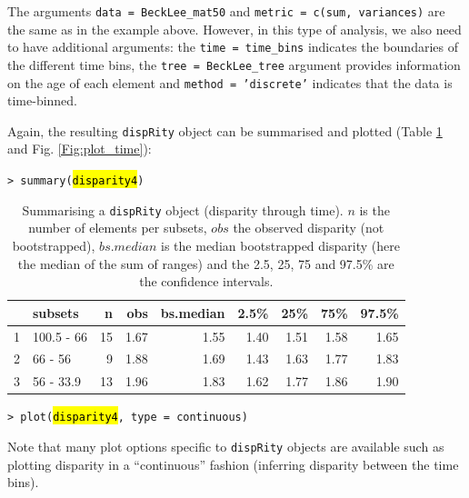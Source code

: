 \documentclass[12pt,letterpaper]{article}
\newcommand{\disp}{\texttt{dispRity} }
\begin{document}
\noindent The arguments \texttt{data = BeckLee\_mat50} and \texttt{metric = c(sum, variances)} are the same as in the example above.
However, in this type of analysis, we also need to have additional arguments: the \texttt{time = time\_bins} indicates the boundaries of the different time bins, the \texttt{tree = BeckLee\_tree} argument provides information on the age of each element and \texttt{method = 'discrete'} indicates that the data is time-binned.

Again, the resulting \disp object can be summarised and plotted (Table \ref{Tab:summary_time} and Fig. \ref{Fig:plot_time}):

\noindent \texttt{> summary(\hl{disparity4})}

\begin{table}[ht]
\centering
\begin{tabular}{rlrrrrrrr}
  \hline
 & subsets & n & obs & bs.median & 2.5\% & 25\% & 75\% & 97.5\% \\ 
  \hline
1 & 100.5 - 66 &  15 & 1.67 & 1.55 & 1.40 & 1.51 & 1.58 & 1.65 \\ 
  2 & 66 - 56 &   9 & 1.88 & 1.69 & 1.43 & 1.63 & 1.77 & 1.83 \\ 
  3 & 56 - 33.9 &  13 & 1.96 & 1.83 & 1.62 & 1.77 & 1.86 & 1.90 \\ 
   \hline
\end{tabular}
\caption{Summarising a \disp object (disparity through time). $n$ is the number of elements per subsets, $obs$ the observed disparity (not bootstrapped), $bs.median$ is the median bootstrapped disparity (here the median of the sum of ranges) and the 2.5, 25, 75 and 97.5\% are the confidence intervals.}
\label{Tab:summary_time}
\end{table}

\noindent \texttt{> plot(\hl{disparity4}, type = \textquotedbl continuous\textquotedbl)}

\noindent Note that many plot options specific to \disp objects are available such as plotting disparity in a ``continuous'' fashion (inferring disparity between the time bins).
\end{document}
